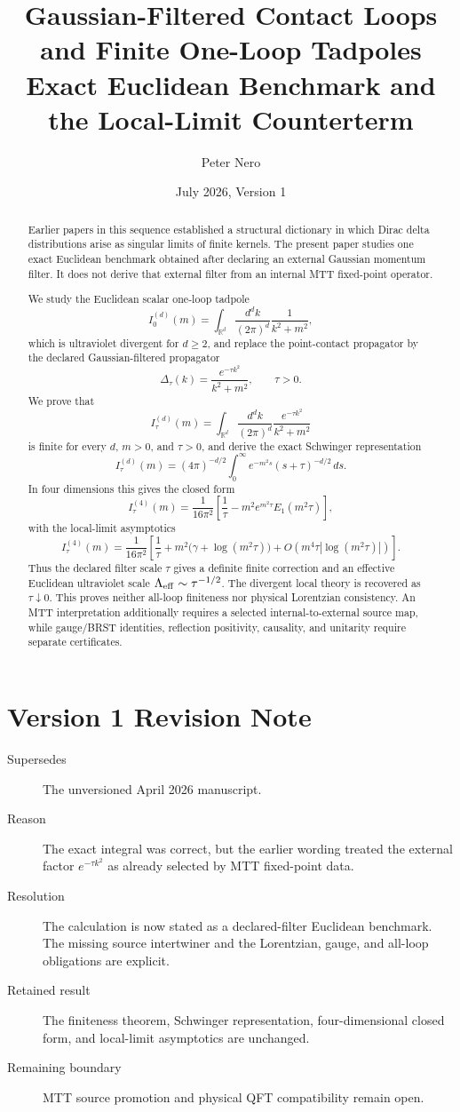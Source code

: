 \documentclass[11pt]{article}
\title{Gaussian-Filtered Contact Loops and Finite One-Loop Tadpoles\\
\large Exact Euclidean Benchmark and the Local-Limit Counterterm}
\author{Peter Nero}
\date{July 2026, Version 1}
\begin{document}
\maketitle

\begin{abstract}
Earlier papers in this sequence established a structural dictionary in which Dirac delta
distributions arise as singular limits of finite kernels.  The present paper studies one exact
Euclidean benchmark obtained after declaring an external Gaussian momentum filter.  It does
not derive that external filter from an internal MTT fixed-point operator.

We study the Euclidean scalar one-loop tadpole
\[
I_0^{(d)}(m)=\int_{\mathbb R^d}\frac{d^d k}{(2\pi)^d}\frac{1}{k^2+m^2},
\]
which is ultraviolet divergent for \(d\ge 2\), and replace the point-contact propagator by the declared Gaussian-filtered propagator
\[
\Delta_\tau(k)=\frac{e^{-\tau k^2}}{k^2+m^2},\qquad \tau>0.
\]
We prove that
\[
I_\tau^{(d)}(m)=\int_{\mathbb R^d}\frac{d^d k}{(2\pi)^d}\frac{e^{-\tau k^2}}{k^2+m^2}
\]
is finite for every \(d\), \(m>0\), and \(\tau>0\), and derive the exact Schwinger representation
\[
I_\tau^{(d)}(m)
=(4\pi)^{-d/2}\int_0^\infty e^{-m^2 s}(s+\tau)^{-d/2}\,ds.
\]
In four dimensions this gives the closed form
\[
I_\tau^{(4)}(m)
=\frac{1}{16\pi^2}\left[
\frac{1}{\tau}
-m^2 e^{m^2\tau}E_1(m^2\tau)
\right],
\]
with the local-limit asymptotics
\[
I_\tau^{(4)}(m)
=
\frac{1}{16\pi^2}
\left[
\frac{1}{\tau}
+
m^2\bigl(\gamma+\log(m^2\tau)\bigr)
+O(m^4\tau|\log(m^2\tau)|)
\right].
\]
Thus the declared filter scale \(\tau\) gives a definite finite correction and an effective
Euclidean ultraviolet scale \(\Lambda_{\rm eff}\sim \tau^{-1/2}\).  The divergent local theory
is recovered as \(\tau\downarrow0\).  This proves neither all-loop finiteness nor physical
Lorentzian consistency.  An MTT interpretation additionally requires a selected
internal-to-external source map, while gauge/BRST identities, reflection positivity,
causality, and unitarity require separate certificates.
\end{abstract}

\section*{Version 1 Revision Note}
\begin{description}
\item[Supersedes] The unversioned April 2026 manuscript.
\item[Reason] The exact integral was correct, but the earlier wording treated the external
factor \(e^{-\tau k^2}\) as already selected by MTT fixed-point data.
\item[Resolution] The calculation is now stated as a declared-filter Euclidean benchmark.
The missing source intertwiner and the Lorentzian, gauge, and all-loop obligations are explicit.
\item[Retained result] The finiteness theorem, Schwinger representation, four-dimensional
closed form, and local-limit asymptotics are unchanged.
\item[Remaining boundary] MTT source promotion and physical QFT compatibility remain open.
\end{description}
\end{document}
